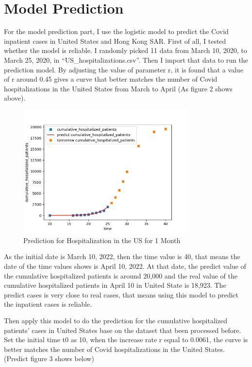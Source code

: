\documentclass[12pt]{article}
\begin{document}
	\section{Model Prediction}
	For the model prediction part, I use the logistic model to predict the Covid inpatient cases in United States and Hong Kong SAR. First of all, I tested whether the model is reliable. I randomly picked 11 data from March 10, 2020, to March 25, 2020, in “US_hospitalizations.csv”. Then I import that data to run the prediction model. By adjusting the value of parameter r, it is found that a value of r around 0.45 gives a curve that better matches the number of Covid hospitalizations in the United States from March to April (As figure 2 shows above).
	\begin{figure}[h]
		\centering
		\includegraphics[width=0.8\textwidth]{Figure2.png}
		\caption{Prediction for Hospitalization in the US for 1 Month}
	\end{figure}
	
	As the initial date is March 10, 2022, then the time value is 40, that means the date of the time values shows is April 10, 2022. At that date, the predict value of the cumulative hospitalized patients is around 20,000 and the real value of the cumulative hospitalized patients in April 10 in United State is 18,923. The predict cases is very close to real cases, that means using this model to predict the inpatient cases is reliable.
	
	Then apply this model to do the prediction for the cumulative hospitalized patients’ cases in United States base on the dataset that been processed before. Set the initial time t0 as 10, when the increase rate r equal to 0.0061, the curve is better matches the number of Covid hospitalizations in the United States. (Predict figure 3 shows below)
	
\end{document}
